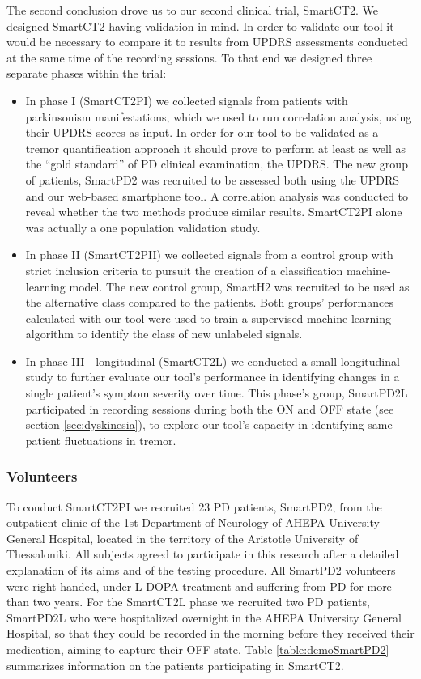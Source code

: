 The second conclusion drove us to our second clinical trial, \gls{SmartCT2}. We designed \gls{SmartCT2} having validation in mind. In order to validate our tool it would be necessary to compare it to results from \gls{UPDRS} assessments conducted at the same time of the recording sessions. To that end we designed three separate phases within the trial:

\begin{itemize}
\item In phase I (\gls{SmartCT2PI}) we collected signals from patients with parkinsonism manifestations, which we used to run correlation analysis, using their \gls{UPDRS} scores as input. In order for our tool to be validated as a tremor quantification approach it should prove to perform at least as well as the ``gold standard'' of \gls{PD} clinical examination, the \gls{UPDRS}. The new group of patients, \gls{SmartPD2} was recruited to be assessed both using the \gls{UPDRS} and our web-based smartphone tool. A correlation analysis was conducted to reveal whether the two methods produce similar results. \gls{SmartCT2PI} alone was actually a one population validation study. 
\item In phase II (\gls{SmartCT2PII}) we collected signals from a control group with strict inclusion criteria to pursuit the creation of a classification machine-learning model. The new control group, \gls{SmartH2} was recruited to be used as the alternative class compared to the patients. Both groups' performances calculated with our tool were used to train a supervised machine-learning algorithm to identify the class of new unlabeled signals. 
\item In phase III - longitudinal (\gls{SmartCT2L}) we conducted a small longitudinal study to further evaluate our tool's performance in identifying changes in a single patient's symptom severity over time. This phase's group, \gls{SmartPD2L} participated in recording sessions during both the ON and OFF state (see section \ref{sec:dyskinesia}), to explore our tool's capacity in identifying same-patient fluctuations in tremor.
\end{itemize}

\subsubsection{Volunteers}
\label{subsubsec:smartCT2Volunteers}
To conduct \gls{SmartCT2PI} we recruited 23 \gls{PD} patients, \gls{SmartPD2}, from the outpatient clinic of the 1st Department of Neurology of AHEPA University General Hospital, located in the territory of the Aristotle University of Thessaloniki. All subjects agreed to participate in this research after a detailed explanation of its aims and of the testing procedure. All \gls{SmartPD2} volunteers were right-handed, under L-DOPA treatment and suffering from \gls{PD} for more than two years.
For the \gls{SmartCT2L} phase we recruited two \gls{PD} patients, \gls{SmartPD2L} who were hospitalized overnight in the AHEPA University General Hospital, so that they could be recorded in the morning before they received their medication, aiming to capture their OFF state. Table \ref{table:demoSmartPD2} summarizes information on the patients participating in \gls{SmartCT2}. 

